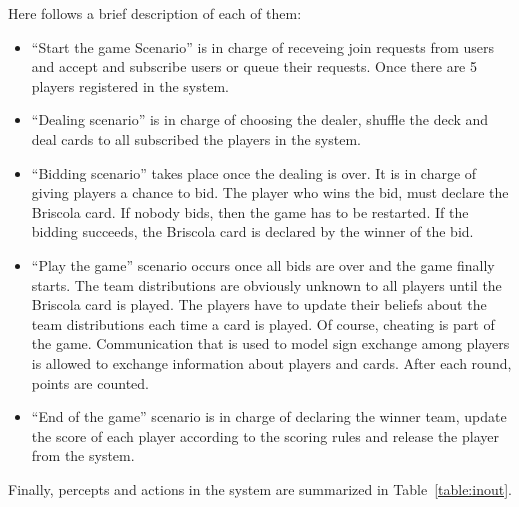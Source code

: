\documentclass[a4paper]{article}
\begin{document}
Here follows a brief description of each of them: 
\begin{itemize}
  \item ``Start the game Scenario'' is in charge of receveing join requests from users and accept and subscribe users or queue their requests. Once there are 5 players registered in the system.
  \item ``Dealing scenario'' is in charge of choosing the dealer, shuffle the deck and deal cards to all subscribed the players in the system. 
  \item ``Bidding scenario'' takes place once the dealing is over. It is in charge of giving players a chance to bid. The player who wins the bid, must declare the Briscola card. If nobody bids, then the game has to be restarted. If the bidding succeeds, the Briscola card is declared by the winner of the bid.
  \item ``Play the game'' scenario occurs once all bids are over and the game finally starts. The team distributions are obviously unknown to all players until the Briscola card is played. The players have to update their beliefs about the team distributions each time a card is played. Of course, cheating is part of the game. Communication that is used to model sign exchange among players is allowed to exchange information about players and cards. After each round, points are counted. 
  \item ``End of the game'' scenario is in charge of declaring the winner team, update the score of each player according to the scoring rules and release the player from the system. 
\end{itemize}

Finally, percepts and actions in the system are summarized in Table~\ref{table:inout}.
\end{document}
